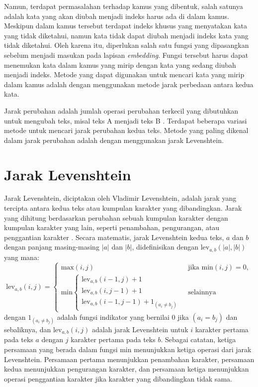 Namun, terdapat permasalahan terhadap kamus yang dibentuk, salah satunya adalah kata yang akan diubah menjadi indeks harus ada di dalam kamus. Meskipun dalam kamus tersebut terdapat indeks khusus yang menyatakan kata yang tidak diketahui, namun kata tidak dapat diubah menjadi indeks kata yang tidak diketahui. Oleh karena itu, diperlukan salah satu fungsi yang dipasangkan sebelum menjadi masukan pada lapisan \textit{embedding}. Fungsi tersebut harus dapat menemukan kata dalam kamus yang mirip dengan kata yang sedang diubah menjadi indeks. Metode yang dapat digunakan untuk mencari kata yang mirip dalam kamus adalah dengan menggunakan metode jarak perbedaan antara kedua kata.

Jarak perubahan adalah jumlah operasi perubahan terkecil yang dibutuhkan untuk mengubah teks, misal teks A menjadi teks B \parencite{schutze2008introduction}. Terdapat beberapa variasi metode untuk mencari jarak perubahan kedua teks. Metode yang paling dikenal dalam jarak perubahan adalah dengan menggunakan jarak Levenshtein.

\section{Jarak Levenshtein}

Jarak Levenshtein, diciptakan oleh Vladimir Levenshtein, adalah jarak yang tercipta antara kedua teks atau kumpulan karakter yang dibandingkan. Jarak yang dihitung berdasarkan perubahan sebuah kumpulan karakter dengan kumpulan karakter yang lain, seperti penambahan, pengurangan, atau penggantian karakter \parencite{levenshtein1966binary}. Secara matematis, jarak Levenshtein kedua teks, $a$ dan $b$ dengan panjang masing-masing $|a|$ dan $|b|$, didefinisikan dengan $\text{lev}_{a,b}(|a|,|b|)$ yang mana:
\begin{equation}
	\text{lev}_{a,b}(i,j)=\begin{cases}
		\text{max}(i,j) & \text{ jika min} (i,j)=0, \\ 
		\text{min}\begin{cases}
			\text{lev}_{a,b}(i-1,j)+1\\ 
			\text{lev}_{a,b}(i,j-1)+1\\ 
			\text{lev}_{a,b}(i-1,j-1)+1_{(a_{i}\neq b_{j})}
		\end{cases} & \text{ selainnya}
	\end{cases}
\end{equation}
\noindent
dengan $1_{(a_{i}\neq b_{j})}$ adalah fungsi indikator yang bernilai 0 jika $(a_{i} = b_{j})$ dan sebaliknya, dan $\text{lev}_{a,b}(i,j)$ adalah jarak Levenshtein untuk $i$ karakter pertama pada teks $a$ dengan $j$ karakter pertama pada teks $b$. Sebagai catatan, ketiga persamaan yang berada dalam fungsi min menunjukkan ketiga operasi dari jarak Levenshtein. Persamaan pertama menunjukkan penambahan karakter, persamaan kedua menunjukkan pengurangan karakter, dan persamaan ketiga menunjukkan operasi penggantian karakter jika karakter yang dibandingkan tidak sama.

